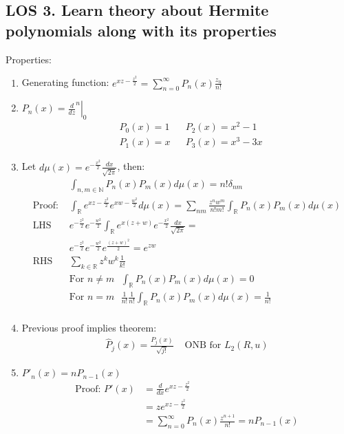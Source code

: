 \documentclass[12pt, a4paper]{article}
\begin{document}
\subsection*{LOS 3. Learn theory about Hermite polynomials along with its properties}
Properties:
\begin{enumerate}
    \item Generating function: $e^{xz - \frac{z^2}{2}} = \sum_{n=0}^\infty P_n(x)\frac{z_n}{n!}$
    \item $P_n(x) = \left.\frac{d}{dz}^n\right\rvert_0$
    \begin{align*}
        &P_0(x) = 1 &&P_2(x) = x^2-1\\
        &P_1(x) = x &&P_3(x) = x^3-3x
    \end{align*}
    \item Let $d\mu(x) = e^{-\frac{x^2}{2}}\frac{dx}{\sqrt{2\pi}}$, then:
    \begin{align*}
        &\int_{n,m \in \mathbb{N}}P_n(x)P_m(x)d\mu(x) = n!\delta_{nm} \\
        \text{Proof: }&\int_{\mathbb{R}}e^{xz - \frac{z^2}{2}} e^{xw - \frac{w^2}{2}}d\mu(x)=\sum_{nm}\frac{z^nw^m}{n!m!}\int_{\mathbb{R}}P_n(x)P_m(x)d\mu(x)\\
        \text{LHS }&e^{-\frac{z^2}{2}}e^{-\frac{w^2}{2}}\int_{\mathbb{R}}e^{x(z+w)}e^{-\frac{x^2}{2}}\frac{dx}{\sqrt{2\pi}}=\\
        &e^{-\frac{z^2}{2}}e^{-\frac{w^2}{2}}e^{\frac{(z+w)^2}{2}} = e^{zw}\\
        \text{RHS }&\sum_{k\in\mathbb{R}}z^kw^k\frac{1}{k!}\\
        &\text{For $n\ne m$ } \int_{\mathbb{R}}P_n(x)P_m(x)d\mu(x) = 0\\
        &\text{For $n= m$ } \frac{1}{n!}\frac{1}{n!}\int_{\mathbb{R}}P_n(x)P_m(x)d\mu(x) = \frac{1}{n!}\\
    \end{align*}
    \item Previous proof implies theorem:
    \begin{align*}
        \hat{P}_j(x) = \frac{P_j(x)}{\sqrt{j!}}&\text{ ONB for }L_2(R, u) 
    \end{align*}
    \item $P'_n(x) = nP_{n-1}(x)$
    \begin{align*}
        \text{Proof: }P'(x)&=\frac{d}{dx}e^{xz - \frac{z^2}{2}}\\
        &=ze^{xz - \frac{z^2}{2}}\\
        &=\sum_{n=0}^\infty P_n(x)\frac{z^{n+1}}{n!} = nP_{n-1}(x)

\end{align*}
\end{enumerate}
\end{document}
